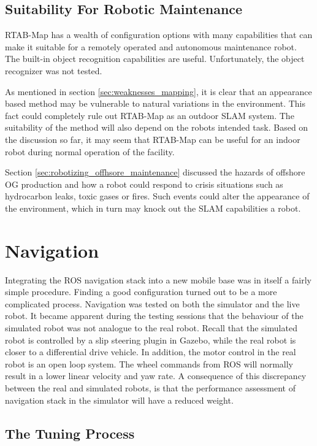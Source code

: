 \subsection{Suitability For Robotic Maintenance}

\ac{RTAB-Map} has a wealth of configuration options with many capabilities that can make it suitable for a remotely operated and autonomous maintenance robot. The built-in object recognition capabilities are useful. Unfortunately, the object recognizer was not tested. 

As mentioned in section \ref{sec:weaknesses_mapping}, it is clear that an appearance based method may be vulnerable to natural variations in the environment. This fact could completely rule out \ac{RTAB-Map} as an outdoor \ac{SLAM} system. The suitability of the method will also depend on the robots intended task. Based on the discussion so far, it may seem that \ac{RTAB-Map} can be useful for an indoor robot during normal operation of the facility. 

Section \ref{sec:robotizing_offhsore_maintenance} discussed the hazards of offshore \ac{OG} production and how a robot could respond to crisis situations such as hydrocarbon leaks, toxic gases or fires. Such events could alter the appearance of the environment, which in turn may knock out the \ac{SLAM} capabilities a robot.

\section{Navigation}

Integrating the \ac{ROS} navigation stack into a new mobile base was in itself a fairly simple procedure. Finding a good configuration turned out to be a more complicated process. Navigation was tested on both the simulator and the live robot. It became apparent during the testing sessions that the behaviour of the simulated robot was not analogue to the real robot. Recall that the simulated robot is controlled by a slip steering plugin in Gazebo, while the real robot is closer to a differential drive vehicle. In addition, the motor control in the real robot is an open loop system. The wheel commands from \ac{ROS} will normally result in a lower linear velocity and yaw rate. A consequence of this discrepancy between the real and simulated robots, is that the performance assessment of navigation stack in the simulator will have a reduced weight.

\subsection{The Tuning Process}

